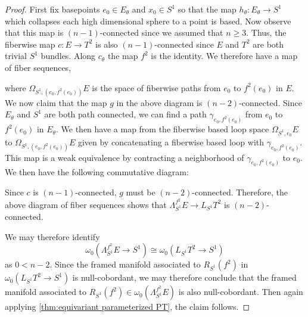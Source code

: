 \documentclass[11pt]{amsart}
\theoremstyle{plain}   %
\theoremstyle{definition}
\theoremstyle{remark}
\numberwithin{equation}{section}
\begin{document}
\begin{proof} 
First fix basepoints $e_0\in E_\theta$ and $x_0\in S^1$ so that the map $h_\theta:E_\theta\to S^1$ which collapses each high dimensional sphere to a point is based. Now observe that this map is $(n-1)$-connected since we assumed that $n\geq 3$. Thus, the fiberwise map $c:E\to T^2$ is also $(n-1)$-connected since $E$ and $T^2$ are both trivial $S^1$ bundles. Along $c_\theta$ the map $f^2$ is the identity. We therefore have a map of fiber sequences,
\begin{figure}[H]
\center
{}
\end{figure}  
where $\Omega_{S^1,(e_0,f^2(e_0))}E$ is the space of fiberwise paths from $e_0$ to $f^2(e_0)$ in $E$. We now claim that the map $g$ in the above diagram is $(n-2)$-connected. Since $E_\theta$ and $S^1$ are both path connected, we can find a path $\gamma_{e_0,f^2(e_0)}$ from $e_0$ to $f^2(e_0)$ in $E_\theta$. We then have a map from the fiberwise based loop space $\Omega_{S^1,e_0} E$ to $\Omega_{S^1,(e_0,f^2(e_0))}E$ given by concatenating a fiberwise based loop with $\gamma_{e_0,f^2(e_0)}$. This map is a weak equivalence by contracting a neighborhood of $\gamma_{e_0,f^2(e_0)}$ to $e_0$. We then have the following commutative diagram:
\begin{figure}[H]
\center
{}
\end{figure}
Since $c$ is $(n-1)$-connected, $g$ must be $(n-2)$-connected. Therefore, the above diagram of fiber sequences shows that $\Lambda_{S^1}^{f^2} E\to L_{S^1}T^2$ is $(n-2)$-connected. 

We may therefore identify 
\[
\omega_{0}(\Lambda_{S^1}^{f^2}E\to S^1) \cong \omega_{0}(L_{S^1} T^2\to S^1)
\] 
as $0<n-2$. Since the framed manifold associated to $R_{S^1}(f^2)$ in $\omega_{0}(L_{S^1}T^2\to S^1)$ is null-cobordant, we may therefore conclude that the framed manifold associated to $R_{S^1}(f^2)\in \omega_0(\Lambda_{S^1}^{f^2}E)$ is also null-cobordant. Then again applying \cref{thm:equivariant parameterized PT}, the claim follows. 
\end{proof}
\end{document}
